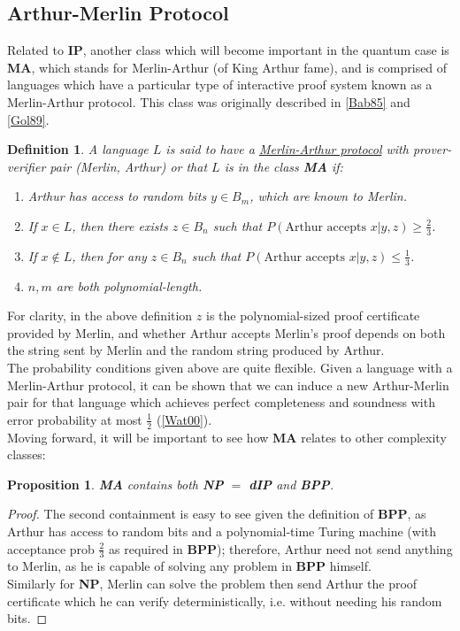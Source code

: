 \documentclass[12pt]{article}
\newtheorem{defn}{Definition}
\newtheorem{prop}{Proposition}
\numberwithin{thm}{section}
\numberwithin{defn}{section}
\numberwithin{prop}{section}
\numberwithin{rmk}{section}
\begin{document}
	\subsection{Arthur-Merlin Protocol}
	Related to \textbf{IP}, another class which will become important in the quantum case is \textbf{MA}, which stands for Merlin-Arthur (of King Arthur fame), and is comprised of languages which have a particular type of interactive proof system known as a Merlin-Arthur protocol. This class was originally described in \hyperref[bab]{[Bab85]} and \hyperref[gol89]{[Gol89]}.
	
	\begin{defn}
		A language $L$ is said to have a \underline{Merlin-Arthur protocol} with prover-verifier pair (Merlin, Arthur) or that $L$ is in the class \textbf{MA} if:
		\begin{enumerate}[label=(\roman*)]
			\item Arthur has access to random bits $y\in B_m$, which are known to Merlin.
			\item If $x\in L$, then there exists $z\in B_n$ such that $P(\text{Arthur accepts }x|y,z)\geq \frac{2}{3}$.
			\item If $x\notin L$, then for any $z\in B_n$ such that $P(\text{Arthur accepts }x|y,z)\leq\frac{1}{3}$. 
			\item $n,m$ are both polynomial-length.
		\end{enumerate}
	
	
	\end{defn}
	 For clarity, in the above definition $z$ is the polynomial-sized proof certificate provided by Merlin, and whether Arthur accepts Merlin's proof depends on both the string sent by Merlin and the random string produced by Arthur.\\
	
	The probability conditions given above are quite flexible. Given a language with a Merlin-Arthur protocol, it can be shown that we can induce a new Arthur-Merlin pair for that language which achieves perfect completeness and soundness with error probability at most $\frac{1}{2}$ (\hyperref[wat00]{[Wat00]}).\\
	
	Moving forward, it will be important to see how \textbf{MA} relates to other complexity classes:
	\begin{prop}\textbf{MA} contains both \textbf{NP} $=$ \textbf{dIP} and \textbf{BPP}. \end{prop}
	\begin{proof}The second containment is easy to see given the definition of \textbf{BPP}, as Arthur has access to random bits and a polynomial-time Turing machine (with acceptance prob $\frac{2}{3}$ as required in \textbf{BPP}); therefore, Arthur need not send anything to Merlin, as he is capable of solving any problem in \textbf{BPP} himself.\\\indent Similarly for \textbf{NP}, Merlin can solve the problem then send Arthur the proof certificate which he can verify deterministically, i.e. without needing his random bits. \end{proof}
	
\end{document}
